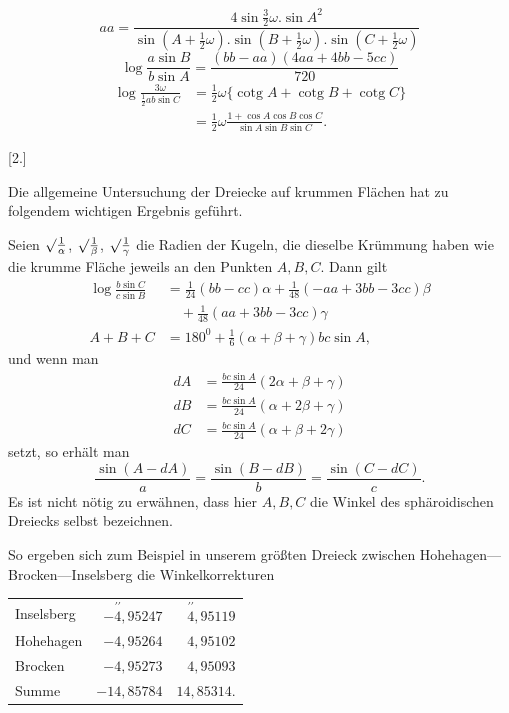 %
\[
aa=\frac{4\sin\frac32\omega.\sin A^2}{\sin(A+\frac12\omega).\sin(B+\frac12\omega).\sin(C+\frac12\omega)}
\]
\[
\log\frac{a\sin B}{b\sin A}=\frac{(bb-aa)(4aa+4bb-5cc)}{720}
\]
\[
\begin{aligned}
\log\frac{3\omega}{\frac12 ab\sin C}&=\tfrac12\omega\{\operatorname{cotg}A+\operatorname{cotg}B+\operatorname{cotg}C\}\\
&=\tfrac12\omega\frac{1+\cos A\cos B\cos C}{\sin A\sin B\sin C}.
\end{aligned}
\]
\par{}\begin{center}[2.]\end{center}
\noindent\hspace*{1.2em}Die allgemeine Untersuchung der Dreiecke auf krummen Flächen hat zu folgendem wichtigen Ergebnis geführt.

Seien $\mathord{\surd}\frac1\alpha$, $\mathord{\surd}\frac1\beta$, $\mathord{\surd}\frac1\gamma$ die Radien der Kugeln, die dieselbe Krümmung haben wie die krumme Fläche jeweils an den Punkten $A,B,C$. Dann gilt
\[
\begin{aligned}
\log\frac{b\sin C}{c\sin B}&=\tfrac1{24}(bb-cc)\alpha+\tfrac1{48}(-aa+3bb-3cc)\beta\\
&\quad+\tfrac1{48}(aa+3bb-3cc)\gamma\\
A+B+C&=180^0+\tfrac16(\alpha+\beta+\gamma)bc\sin A,
\end{aligned}
\]
\noindent und wenn man
\[
\begin{aligned}
dA&=\frac{bc\sin A}{24}(2\alpha+\beta+\gamma)\\
dB&=\frac{bc\sin A}{24}(\alpha+2\beta+\gamma)\\
dC&=\frac{bc\sin A}{24}(\alpha+\beta+2\gamma)
\end{aligned}
\]
\noindent setzt, so erhält man
\[
\frac{\sin(A-dA)}a=\frac{\sin(B-dB)}b=\frac{\sin(C-dC)}c.
\]
\indent Es ist nicht nötig zu erwähnen, dass hier $A,B,C$ die Winkel des sphäroidischen Dreiecks selbst bezeichnen.

So ergeben sich zum Beispiel in unserem größten Dreieck zwischen Hohe\-hagen---Brocken---Inselsberg die Winkelkorrekturen
\begin{center}\begin{tabular}{lrr}
Inselsberg & $-\overset{\prime\prime}{4}{,}95247$ & $\overset{\prime\prime}{4}{,}95119$\\
Hohehagen & $-4{,}95264$ & $4{,}95102$\\
Brocken & $-4{,}95273$ & $4{,}95093$\\
Summe & $-14{,}85784$ & $14{,}85314.$
\end{tabular}\end{center}
